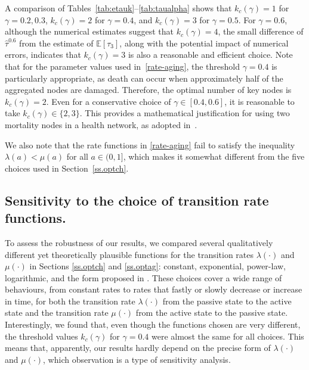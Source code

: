 \documentclass[11pt]{article}
\numberwithin{equation}{section}
\begin{document}
\vspace*{3mm}
A comparison of Tables~\ref{tab:etauk}--\ref{tab:taualpha} shows that $k_c(\gamma) = 1$ for $\gamma = 0.2, 0.3$, $k_c(\gamma) = 2$ for $\gamma = 0.4$, and $k_c(\gamma) = 3$ for $\gamma = 0.5$. For $\gamma = 0.6$, although the numerical estimates suggest that $k_c(\gamma) = 4$, the small difference of $\hat{\tau}^{0.6}$ from the estimate of $\mathbb{E}[\tau_3]$, along with the potential impact of numerical errors, indicates that $k_c(\gamma) = 3$ is also a reasonable and efficient choice. Note that for the parameter values used in~\eqref{rate-aging}, the threshold $\gamma = 0.4$ is particularly appropriate, as death can occur when approximately half of the aggregated nodes are damaged. Therefore, the optimal number of key nodes is $k_c(\gamma) = 2$. Even for a conservative choice of $\gamma \in [0.4, 0.6]$, it is reasonable to take $k_c(\gamma) \in \{2, 3\}$. This provides a mathematical justification for using two mortality nodes in a health network, as adopted in~\cite{MRFR2017, Aging}.

We also note that the rate functions in \eqref{rate-aging} fail to satisfy the inequality $\lambda(a)<\mu(a)$ for all $a \in (0,1]$, which makes it somewhat different from the five choices used in Section~\ref{ss.optch}. 

\subsection{Sensitivity to the choice of transition rate functions.}
To assess the robustness of our results, we compared several qualitatively different yet theoretically plausible functions for the transition rates $\lambda(\cdot)$ and $\mu(\cdot)$ in Sections \ref{ss.optch} and \ref{ss.optag}: constant, exponential, power-law, logarithmic, and the form proposed in \cite{MRFR2017}. These choices cover a wide range of behaviours, from constant rates to rates that fastly or slowly decrease or increase in time, for both the transition rate $\lambda(\cdot)$ from the passive state to the active state and the transition rate $\mu(\cdot)$ from the active state to the passive state. Interestingly, we found that, even though the functions chosen are very different, the threshold values $k_c(\gamma)$ for $\gamma=0.4$ were almost the same for all choices. This means that, apparently, our results hardly depend on the precise form of $\lambda(\cdot)$ and $\mu(\cdot)$, which observation is a type of sensitivity analysis.
\end{document}
